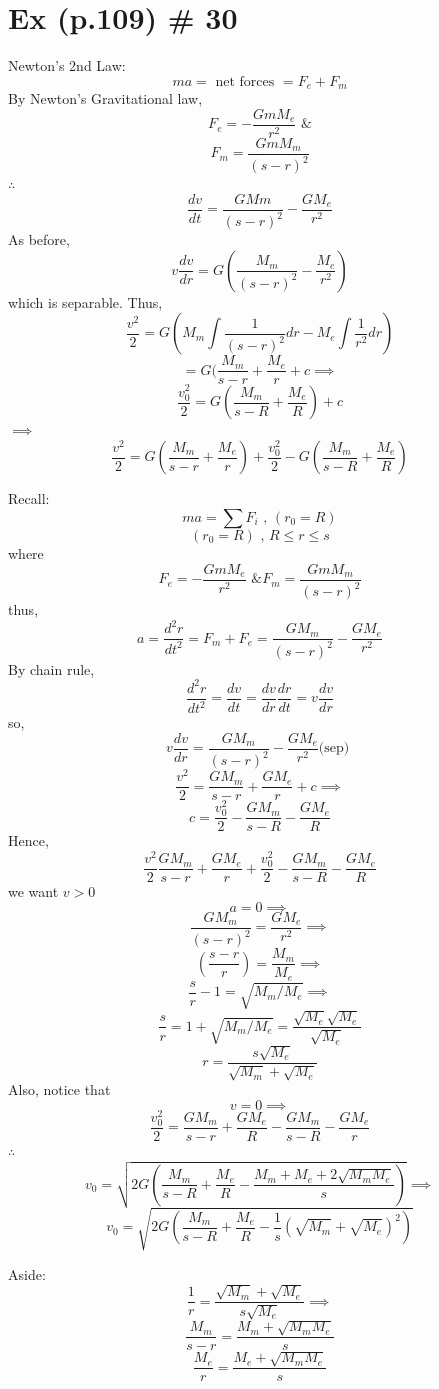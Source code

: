 \documentclass[10pt,a4paper]{article}
\begin{document}
\section*{Ex (p.109) \# 30}
  Newton's 2nd Law: 
  \[ ma = \text{ net forces } = F_e + F_m \]
  By Newton's Gravitational law, 
  \[ F_e = - \frac{GmM_e}{r^2} \text{ \& } \]
  \[ F_m = \frac{GmM_m}{(s-r)^2} \]
  \( \therefore \)
  \[ \frac{dv}{dt} = \frac{GMm}{(s-r)^2}- \frac{GM_e}{r^2} \]
  As before, 
  \[ v \frac{dv}{dr} = G( \frac{M_m}{(s-r)^2} - \frac{M_e}{r^2}) \]
  which is separable. Thus, 
  \[ \frac{v^2}{2} = G( M_m \int \frac{1}{(s-r)^2}dr - M_e \int
  \frac{1}{r^2}dr)  \]
  \[ = G( \frac{M_m}{s-r} + \frac{M_e}{r} + c \implies \]
  \[ \frac{v_0^2}{2} = G( \frac{M_m}{s-R} + \frac{M_e}{R}) + c \]
  \( \implies \)
  \[ \frac{v^2}{2} = G ( \frac{M_m}{s-r} + \frac{M_e}{r}) +
  \frac{v_0^2}{2} -G( \frac{M_m}{s-R}+ \frac{M_e}{R})
  \]

  \newpage
  Recall: 
  \[ ma = \sum F_i \text{ , } (r_0 = R) \]
  \[(r_0 = R) \text{ ,  } R \leq r \leq s \]
  where
  \[ F_e = - \frac{GmM_e}{r^2} \text{ \& } F_m = \frac{GmM_m}{(s-r)^2} \]
  thus, 
  \[ a = \frac{d^2r}{dt^2} = F_m + F_e = \frac{GM_m}{(s-r)^2}-
  \frac{GM_e}{r^2} \]
  By chain rule, 
  \[ \frac{d^2r}{dt^2} = \frac{dv}{dt} = \frac{dv}{dr} \frac{dr}{dt} = v
  \frac{dv}{dr} \]
  so, 
  \[ v \frac{dv}{dr} = \frac{GM_m}{(s-r)^2} - \frac{GM_e}{r^2} \text{
  (sep) } \]
  \[ \frac{v^2}{2} = \frac{GM_m}{s-r}+ \frac{GM_e}{r} + c \implies \]
  \[ c = \frac{v_0^2}{2} - \frac{GM_m}{s-R} - \frac{GM_e}{R} \]
  Hence, 
  \[ \frac{v^2}{2} \frac{GM_m}{s-r} + \frac{GM_e}{r}+ \frac{v_0^2}{2} -
  \frac{GM_m}{s-R} - \frac{GM_e}{R} \]
  we want \( v>0 \) %
  \[ a = 0 \implies \]
  \[ \frac{GM_m}{(s-r)^2} = \frac{GM_e}{r^2} \implies \]
  \[ (\frac{s-r}{r}) = \frac{M_m}{M_e} \implies \]
  \[ \frac{s}{r} -1  = \sqrt{M_m/M_e} \implies \]
  \[ \frac{s}{r} = 1 + \sqrt{M_m/M_e} = \frac{ \sqrt{M_e} \sqrt{M_e}}{
  \sqrt{M_e}} \]
  \[ r = \frac{s \sqrt{M_e}}{ \sqrt{M_m} + \sqrt{M_e}} \]
  Also, notice that 
  \[ v=0 \implies \]
  \[ \frac{v_0^2}{2} = \frac{GM_m}{s-r} + \frac{GM_e}{R} -
  \frac{GM_m}{s-R} - \frac{GM_e}{r} \]
  \( \therefore \)
  \[ v_0 = \sqrt{ 2G ( \frac{M_m}{s-R} + \frac{M_e}{R} - \frac{M_m +M_e +
  2 \sqrt{M_mM_e}}{s})} \implies \]
  \[ \boxed{ v_0 = \sqrt{2G ( \frac{M_m}{s-R} + \frac{M_e}{R} -
  \frac{1}{s}( \sqrt{M_m} + \sqrt{M_e})^2)}} \]

  Aside: 
  \[ \frac{1}{r} = \frac{ \sqrt{M_m} + \sqrt{M_e}}{s \sqrt{M_e}} \implies \]
  \[ \frac{M_m}{s-r} = \frac{M_m + \sqrt{M_mM_e}}{s} \]
  \[ \frac{M_e}{r} = \frac{M_e + \sqrt{M_mM_e}}{s} \]
\end{document}
